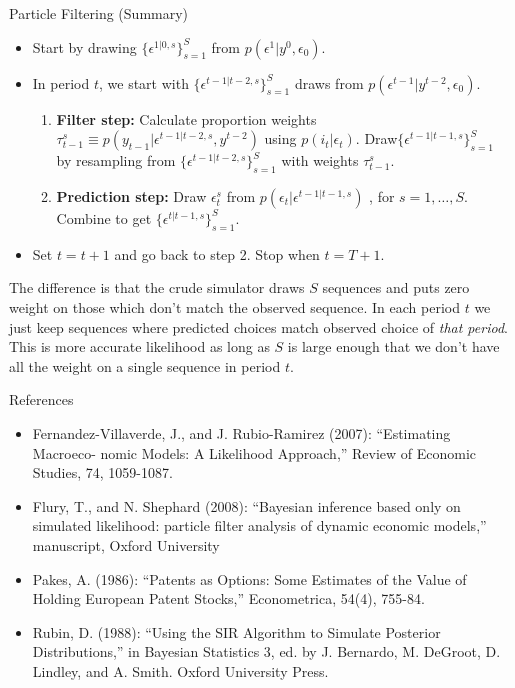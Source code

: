 \documentclass[xcolor=pdftex,dvipsnames,table,mathserif,aspectratio=169]{beamer}
\begin{document}
\begin{frame}{Particle Filtering (Summary)}
\begin{itemize}
\item Start by drawing $\{ \epsilon^{1|0,s}\}_{s=1}^S$ from $p(\epsilon^1 | y^0, \epsilon_0)$.
\item In period $t$, we start with $\{ \epsilon^{t-1|t-2,s}\}_{s=1}^S$ draws from $p(\epsilon^{t-1} | y^{t-2},\epsilon_0)$.
\begin{enumerate}
\item \textbf{Filter step:} Calculate proportion weights $\tau_{t-1}^s \equiv p(y_{t-1} | \epsilon^{t-1 | t-2,s}, y^{t-2}) $ using $p(i_t | \epsilon_t)$. Draw$\{\epsilon^{t-1 | t-1,s}\}_{s=1}^S$ by resampling from $\{ \epsilon^{t-1|t-2,s}\}_{s=1}^S$ with weights $\tau_{t-1}^s$.
\item \textbf{Prediction step:} Draw $\epsilon_t^s$ from $p(\epsilon_t | \epsilon^{t-1 | t-1,s})$ , for $s=1,\ldots,S$. Combine to get 
$\{ \epsilon^{t | t-1,s} \}_{s=1}^S$.
\end{enumerate}
\item Set $t=t+1$ and go back to step 2.  Stop when $t=T+1$.
\end{itemize}
The difference is that the crude simulator draws $S$ sequences and puts zero weight on those which don't match the observed sequence. In each period $t$ we just keep sequences where predicted choices match observed choice of \textit{that period}. This is more accurate likelihood as long as $S$ is large enough that we don't have all the weight on a single sequence in period $t$.
\end{frame}


\begin{frame}{References}
\begin{itemize}
\item Fernandez-Villaverde, J., and J. Rubio-Ramirez (2007): ``Estimating Macroeco- nomic Models: A Likelihood Approach,'' Review of Economic Studies, 74, 1059-1087.\\
\item Flury, T., and N. Shephard (2008): ``Bayesian inference based only on simulated likelihood: particle filter analysis of dynamic economic models,'' manuscript, Oxford University\\
\item Pakes, A. (1986): ``Patents as Options: Some Estimates of the Value of Holding European Patent Stocks,'' Econometrica, 54(4), 755-84.\\
\item Rubin, D. (1988): ``Using the SIR Algorithm to Simulate Posterior Distributions,'' in Bayesian Statistics 3, ed. by J. Bernardo, M. DeGroot, D. Lindley, and A. Smith. Oxford University Press.\\
\end{itemize}
\end{frame}
\end{document}
